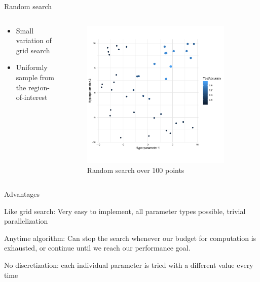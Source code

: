 \begin{frame}{Random search}



\begin{columns}
\begin{column}{0.49\textwidth}
\begin{itemize}
\item Small variation of grid search
\item Uniformly sample from the region-of-interest
\end{itemize}
\end{column}
\begin{column}{0.49\textwidth}
\vspace*{-0.8cm}
\begin{center}
\begin{figure}
\includegraphics[width=0.9\textwidth]{images/random.png}
\caption*{Random search over 100 points}
\end{figure}
\end{center}
\end{column}
\end{columns}

\framebreak

\begin{blocki}{Advantages}
\item Like grid search: Very easy to implement, all parameter types possible, trivial parallelization
\item Anytime algorithm: Can stop the search whenever our budget for computation is exhausted, or continue until we reach our performance goal.
\item No discretization: each individual parameter is tried with a different value every time
\end{blocki}


\end{frame}
